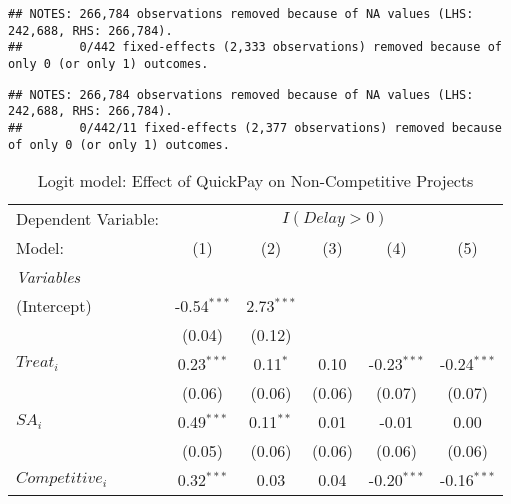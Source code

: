 \documentclass[
]{article}
\begin{document}
\begin{verbatim}
## NOTES: 266,784 observations removed because of NA values (LHS: 242,688, RHS: 266,784).
##        0/442 fixed-effects (2,333 observations) removed because of only 0 (or only 1) outcomes.
\end{verbatim}

\begin{verbatim}
## NOTES: 266,784 observations removed because of NA values (LHS: 242,688, RHS: 266,784).
##        0/442/11 fixed-effects (2,377 observations) removed because of only 0 (or only 1) outcomes.
\end{verbatim}

\begin{table}[htbp]
   \centering
   \caption{Logit model: Effect of QuickPay on Non-Competitive Projects}
   \begin{tabular}{lccccc}
      \tabularnewline\midrule\midrule
      Dependent Variable: & \multicolumn{5}{c}{$I(Delay>0)$}\\
      Model:                                                                  & (1)           & (2)           & (3)           & (4)           & (5)\\
      \midrule \emph{Variables} &   &   &   &   &  \\
      (Intercept)                                                             & -0.54$^{***}$ & 2.73$^{***}$  &               &               &   \\
                                                                              & (0.04)        & (0.12)        &               &               &   \\
      $Treat_i$                                                               & 0.23$^{***}$  & 0.11$^{*}$    & 0.10          & -0.23$^{***}$ & -0.24$^{***}$\\
                                                                              & (0.06)        & (0.06)        & (0.06)        & (0.07)        & (0.07)\\
      $SA_i$                                                                  & 0.49$^{***}$  & 0.11$^{**}$   & 0.01          & -0.01         & 0.00\\
                                                                              & (0.05)        & (0.06)        & (0.06)        & (0.06)        & (0.06)\\
      $Competitive_i$                                                         & 0.32$^{***}$  & 0.03          & 0.04          & -0.20$^{***}$ & -0.16$^{***}$\\

\end{tabular}
\end{table}
\end{document}
